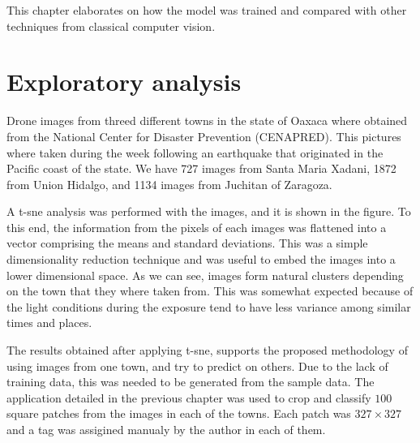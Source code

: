This chapter elaborates on how the model was trained and compared with other techniques from classical computer vision. 

\section{Exploratory analysis}

Drone images from threed different towns in the state of Oaxaca where obtained from the National Center for Disaster Prevention (CENAPRED). This pictures where taken during the week following an earthquake that originated in the Pacific coast of the state. We have 727 images from Santa Maria Xadani, 1872 from Union Hidalgo, and 1134 images from Juchitan of Zaragoza. 


A t-sne analysis was performed with the images, and it is shown in the figure. To this end, the information from the pixels of each images was flattened into a vector comprising the means and standard deviations. This was a simple dimensionality reduction technique and was useful to embed the images into a lower dimensional space. As we can see, images form natural clusters depending on the town that they where taken from. This was somewhat expected because of the light conditions during the exposure tend to have less variance among similar times and places.

\begin{figure}[h]
  \begin{center}
  \end{center}
\end{figure}

The results obtained after applying t-sne, supports the proposed methodology of using images from one town, and try to predict on others. Due to the lack of training data, this was needed to be generated from the sample data. The application detailed in the previous chapter was used to crop and classify $100$ square patches from the images in each of the towns. Each patch was $327\times 327$ and a tag was assigined manualy by the author in each of them.

